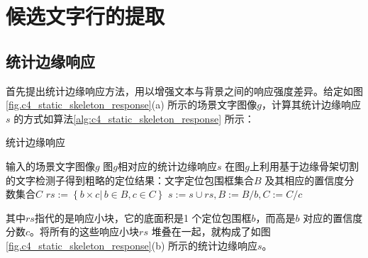     \section{候选文字行的提取}

        \subsection{统计边缘响应}

        首先提出统计边缘响应方法，用以增强文本与背景之间的响应强度差异。给定如图\ref{fig.c4_static_skeleton_response}(a) 所示的场景文字图像$g$，计算其统计边缘响应$s$ 的方式如算法\ref{alg:c4_static_skeleton_response} 所示：

        \begin{algorithm} \renewcommand{\algorithmicrequire}{\textbf{输入:}}	\renewcommand{\algorithmicensure}{\textbf{输出:}}
    	\caption{统计边缘响应}
    	\label{alg:c4_static_skeleton_response}
    	\begin{algorithmic}[1]
    		\REQUIRE 输入的场景文字图像$g$
    		\ENSURE 图$g$相对应的统计边缘响应$s$
            \STATE 在图$g$上利用基于边缘骨架切割的文字检测子得到粗略的定位结果：文字定位包围框集合$B$ 及其相应的置信度分数集合$C$
    		\REPEAT
            \STATE $rs:=\left\{ b \times c  |\,b \in B, c \in C\right\}$
            \STATE $s:=s\cup rs,B:=B / b,C:=C / c$
    	\end{algorithmic}
        \end{algorithm}

        其中$rs$指代的是响应小块，它的底面积是1 个定位包围框$b$，而高是$b$ 对应的置信度分数$c$。将所有的这些响应小块$rs$ 堆叠在一起，就构成了如图\ref{fig.c4_static_skeleton_response}(b) 所示的统计边缘响应$s$。

